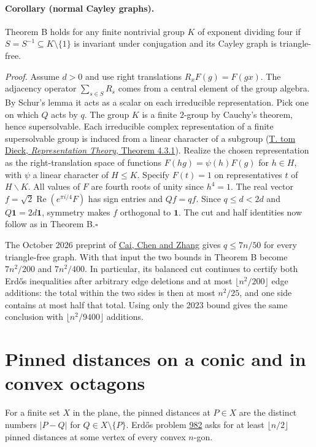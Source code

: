 \documentclass[11pt]{article}
\begin{document}
\paragraph{Corollary (normal Cayley graphs).}
Theorem B holds for any finite nontrivial group $K$ of exponent dividing
four if $S=S^{-1}\subseteq K\setminus\{1\}$ is invariant under
conjugation and its Cayley graph is triangle-free.

\noindent\emph{Proof.}
Assume $d>0$ and use right translations $R_xF(g)=F(gx)$. The adjacency
operator $\sum_{s\in S}R_s$ comes from a central element of the group
algebra. By Schur's lemma it acts as a scalar on each irreducible
representation. Pick one on which $Q$ acts by $q$. The group $K$ is a finite
$2$-group by Cauchy's theorem, hence supersolvable. Each irreducible
complex representation of a finite supersolvable group is induced
from a linear character of a subgroup
(\href{https://www.uni-math.gwdg.de/tammo/rep.pdf}{T. tom Dieck,
\emph{Representation Theory}, Theorem 4.3.1}). Realize the chosen
representation as the right-translation space of functions
$F(hg)=\psi(h)F(g)$ for $h\in H$, with $\psi$ a linear character of
$H\le K$. Specify $F(t)=1$ on representatives $t$ of $H\backslash K$.
All values of $F$ are fourth roots of unity since $h^4=1$. The
real vector $f=\sqrt2\operatorname{Re}(e^{\pi i/4}F)$ has sign
entries and $Qf=qf$. Since $q\le d<2d$ and $Q\mathbf 1=2d\mathbf 1$,
symmetry makes $f$ orthogonal to $\mathbf 1$. The cut and half identities
now follow as in Theorem B.\hfill$\square$

The October 2026 preprint of
\href{https://arxiv.org/abs/2610.14503}{Cai, Chen and Zhang}
gives $q\le7n/50$ for every triangle-free graph. With that input the
two bounds in Theorem B become $7n^2/200$ and $7n^2/400$. In particular,
its balanced cut continues to certify both Erd\H{o}s inequalities after
arbitrary edge deletions and at most $\lfloor n^2/200\rfloor$ edge
additions: the total within the two sides is then at most $n^2/25$, and
one side contains at most half that total. Using only the 2023 bound
gives the same conclusion with $\lfloor n^2/9400\rfloor$ additions.

\clearpage

\section{Pinned distances on a conic and in convex octagons}
For a finite set $X$ in the plane, the pinned distances at $P\in X$ are the distinct numbers $|P-Q|$ for $Q\in X\setminus\{P\}$. Erd\H{o}s problem \href{https://www.erdosproblems.com/982}{982} asks for at least $\lfloor n/2\rfloor$ pinned distances at some vertex of every convex $n$-gon.
\end{document}
